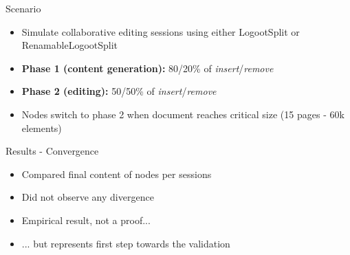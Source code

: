\documentclass[10pt]{beamer}
\begin{document}

\begin{frame}{Scenario}
  \begin{itemize}
    \item Simulate collaborative editing sessions using either LogootSplit or RenamableLogootSplit
    \item \textbf{Phase 1 (content generation):} 80/20\% of \emph{insert}/\emph{remove}
    \item \textbf{Phase 2 (editing):} 50/50\% of \emph{insert}/\emph{remove}
    \item Nodes switch to phase 2 when document reaches critical size (15 pages - 60k elements)
  \end{itemize}
\end{frame}

\begin{frame}{Results - Convergence}
  \begin{itemize}
    \item Compared final content of nodes per sessions
    \item Did not observe any divergence
    \bigskip
    \item Empirical result, not a proof...
    \item ... but represents first step towards the validation
  \end{itemize}
\end{frame}
\end{document}
